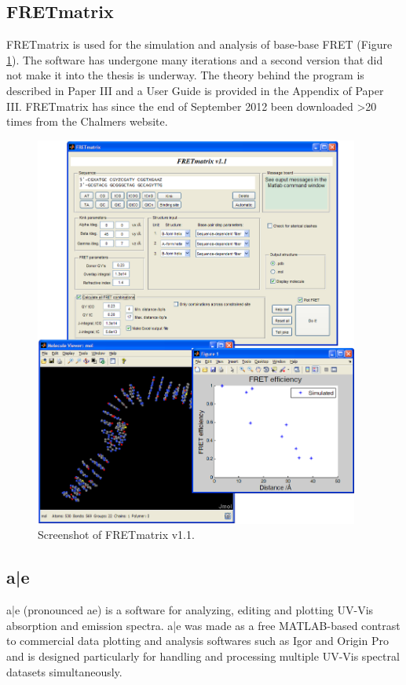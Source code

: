 \subsection{FRETmatrix}
 FRETmatrix is used for the simulation and analysis of base-base FRET (Figure \ref{Fig:chap_Papers_FRETmatrix}). The software has undergone many iterations and a second version that did not make it into the thesis is underway. The theory behind the program is described in Paper III and a User Guide is provided in the Appendix of Paper III. FRETmatrix has since the end of September 2012 been downloaded >20 times from the Chalmers website.
\begin{figure}
    \centering
        \includegraphics[width=0.95\textwidth]{adds//fretmatrix_fig.png}
    \captionsetup{width=.95\textwidth}
    \caption{Screenshot of FRETmatrix v1.1.}
    \label{Fig:chap_Papers_FRETmatrix}
\end{figure}

\subsection{a|e}
 a|e (pronounced ae) is a software for analyzing, editing and plotting UV-Vis absorption and emission spectra. a|e was made as a free MATLAB-based contrast to commercial data plotting and analysis softwares such as Igor and Origin Pro and is designed particularly for handling and processing multiple UV-Vis spectral datasets simultaneously.


